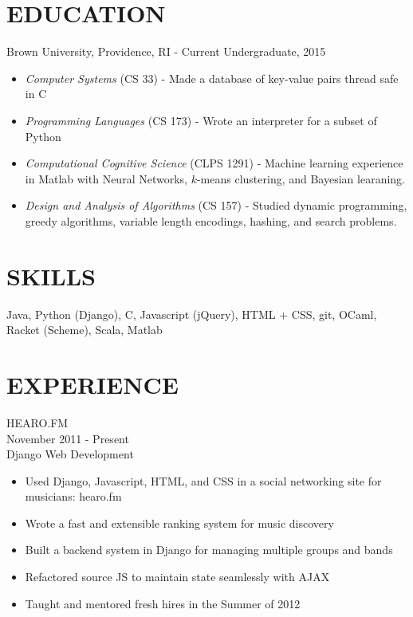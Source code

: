 \documentclass[11pt]{res} %
\begin{document}
\begin{resume}

\section{EDUCATION} 
Brown University, Providence, RI - Current Undergraduate, 2015
\begin{itemize} \itemsep -2pt
  \item \emph{Computer Systems} (CS 33) - Made a database of key-value pairs thread safe in C
  \item \emph{Programming Languages} (CS 173) - Wrote an interpreter for a subset of Python
  \item \emph{Computational Cognitive Science} (CLPS 1291) - Machine learning experience in Matlab with Neural Networks, $k$-means clustering, and Bayesian learaning.
  \item \emph{Design and Analysis of Algorithms} (CS 157) - Studied dynamic programming, greedy algorithms, variable length encodings, hashing,  and search problems.
\end{itemize}

 \section{SKILLS} 
	Java, Python (Django), C, Javascript (jQuery),  HTML +  CSS, git, OCaml, Racket (Scheme), Scala, Matlab

\section{EXPERIENCE}
HEARO.FM \\
November 2011 - Present \\
Django Web Development
\vspace{0.02in}
   \begin{itemize} \itemsep -2pt
   \item Used Django, Javascript, HTML, and CSS in a social networking site for musicians: hearo.fm
   \item Wrote a fast and extensible ranking system for music discovery

   \item Built a backend system in Django for managing multiple groups and bands
   \item Refactored source JS to maintain state seamlessly with AJAX
   \item Taught and mentored fresh hires in the Summer of 2012
   \end{itemize}


\end{resume}
\end{document}
